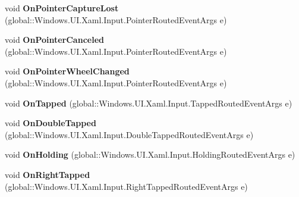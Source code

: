 \begin{DoxyCompactItemize}
void {\bfseries On\+Pointer\+Capture\+Lost} (global\+::\+Windows.\+U\+I.\+Xaml.\+Input.\+Pointer\+Routed\+Event\+Args e)
\item 
\mbox{\label{interface_windows_1_1_u_i_1_1_xaml_1_1_controls_1_1_i_control_overrides_af3cfd6f136b89bd611f4f199a47e9103}} 
void {\bfseries On\+Pointer\+Canceled} (global\+::\+Windows.\+U\+I.\+Xaml.\+Input.\+Pointer\+Routed\+Event\+Args e)
\item 
\mbox{\label{interface_windows_1_1_u_i_1_1_xaml_1_1_controls_1_1_i_control_overrides_a718444e3da7d52bbefe627be97c6acb1}} 
void {\bfseries On\+Pointer\+Wheel\+Changed} (global\+::\+Windows.\+U\+I.\+Xaml.\+Input.\+Pointer\+Routed\+Event\+Args e)
\item 
\mbox{\label{interface_windows_1_1_u_i_1_1_xaml_1_1_controls_1_1_i_control_overrides_a03ba05ffb887e2d5b8a4e46f27ed4817}} 
void {\bfseries On\+Tapped} (global\+::\+Windows.\+U\+I.\+Xaml.\+Input.\+Tapped\+Routed\+Event\+Args e)
\item 
\mbox{\label{interface_windows_1_1_u_i_1_1_xaml_1_1_controls_1_1_i_control_overrides_a5a5f4e8f42a2fe161802c62c49b6876c}} 
void {\bfseries On\+Double\+Tapped} (global\+::\+Windows.\+U\+I.\+Xaml.\+Input.\+Double\+Tapped\+Routed\+Event\+Args e)
\item 
\mbox{\label{interface_windows_1_1_u_i_1_1_xaml_1_1_controls_1_1_i_control_overrides_a92652b416b1ff3a471b4cf7226c1f60f}} 
void {\bfseries On\+Holding} (global\+::\+Windows.\+U\+I.\+Xaml.\+Input.\+Holding\+Routed\+Event\+Args e)
\item 
\mbox{\label{interface_windows_1_1_u_i_1_1_xaml_1_1_controls_1_1_i_control_overrides_a5fbc80a16d3e6c89a86a5b99d3cca69f}} 
void {\bfseries On\+Right\+Tapped} (global\+::\+Windows.\+U\+I.\+Xaml.\+Input.\+Right\+Tapped\+Routed\+Event\+Args e)
\item 
\mbox{\label{interface_windows_1_1_u_i_1_1_xaml_1_1_controls_1_1_i_control_overrides_aa77c2f27ff19f19ddb9d11c56eb88ecf}} 

\end{DoxyCompactItemize}
